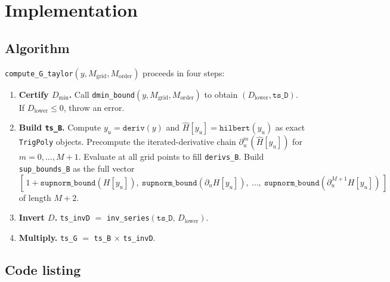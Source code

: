 \documentclass[11pt]{article}
\theoremstyle{definition}
\begin{document}
\section{Implementation}

\subsection{Algorithm}

\texttt{compute\_G\_taylor}$(y, M_{\mathrm{grid}}, M_{\mathrm{order}})$
proceeds in four steps:

\begin{enumerate}
  \item \textbf{Certify $D_{\min}$.}
        Call \texttt{dmin\_bound}$(y, M_{\mathrm{grid}}, M_{\mathrm{order}})$
        to obtain $(D_{\mathrm{lower}}, \texttt{ts\_D})$.
        If $D_{\mathrm{lower}} \le 0$, throw an error.
  \item \textbf{Build \texttt{ts\_B}.}
        Compute $y_u = \texttt{deriv}(y)$ and $\hat H[y_u] = \texttt{hilbert}(y_u)$
        as exact \texttt{TrigPoly} objects.
        Precompute the iterated-derivative chain
        $\partial_u^m(\hat H[y_u])$ for $m = 0,\ldots,M+1$.
        Evaluate at all grid points to fill \texttt{derivs\_B}.
        Build \texttt{sup\_bounds\_B} as the full vector
        $[\,1 + \texttt{supnorm\_bound}(H[y_u]),\ \texttt{supnorm\_bound}(\partial_u H[y_u]),\ \ldots,\ \texttt{supnorm\_bound}(\partial_u^{M+1} H[y_u])\,]$ of length $M{+}2$.
  \item \textbf{Invert $D$.}
        \texttt{ts\_invD} $=$ \texttt{inv\_series}$(\texttt{ts\_D},\,D_{\mathrm{lower}})$.
  \item \textbf{Multiply.}
        \texttt{ts\_G} $=$ \texttt{ts\_B} $\times$ \texttt{ts\_invD}.
\end{enumerate}

\subsection{Code listing}
\end{document}
